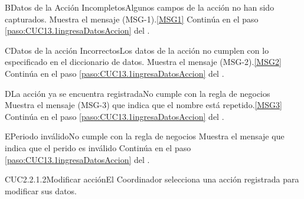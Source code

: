 	\begin{UCtrayectoriaA}{B}{Datos de la Acción Incompletos}{Algunos campos de la acción no han sido capturados.}
			\UCpaso Muestra el mensaje (MSG-1).\ref{MSG1}
			\UCpaso Continúa en el paso \ref{paso:CUC13.1ingresaDatosAccion} del .
	\end{UCtrayectoriaA}

	\begin{UCtrayectoriaA}{C}{Datos de la acción Incorrectos}{Los datos de la acción no cumplen con lo especificado en el diccionario de datos.}
			\UCpaso Muestra el mensaje (MSG-2).\ref{MSG2}
			\UCpaso Continúa en el paso \ref{paso:CUC13.1ingresaDatosAccion} del .
	\end{UCtrayectoriaA}

		\begin{UCtrayectoriaA}{D}{La acción ya se encuentra registrada}{No cumple con la regla de negocios }
			\UCpaso Muestra el mensaje (MSG-3) que indica que el nombre está repetido.\ref{MSG3}
			\UCpaso Continúa en el paso \ref{paso:CUC13.1ingresaDatosAccion} del .
		\end{UCtrayectoriaA}
		\begin{UCtrayectoriaA}{E}{Periodo inválido}{No cumple con la regla de negocios }
			\UCpaso Muestra el mensaje  que indica que el perido es inválido
			\UCpaso Continúa en el paso \ref{paso:CUC13.1ingresaDatosAccion} del .
		\end{UCtrayectoriaA}

	\begin{UseCase}{CUC2.2.1.2}{Modificar acción}{El Coordinador selecciona una acción registrada para modificar sus datos.}
	\end{UseCase}

